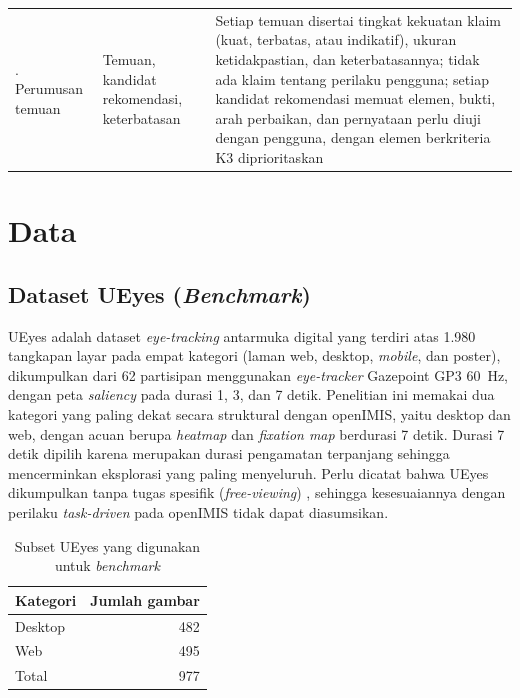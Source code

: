 \begin{longtable}{>{\raggedright\arraybackslash}p{}>{\raggedright\arraybackslash}p{}>{\raggedright\arraybackslash}p{}}
\hline
8. Perumusan temuan & Temuan, kandidat rekomendasi, keterbatasan & Setiap temuan disertai tingkat kekuatan klaim (kuat, terbatas, atau indikatif), ukuran ketidakpastian, dan keterbatasannya; tidak ada klaim tentang perilaku pengguna; setiap kandidat rekomendasi memuat elemen, bukti, arah perbaikan, dan pernyataan perlu diuji dengan pengguna, dengan elemen berkriteria K3 diprioritaskan \\
\end{longtable}

\section{Data}
\label{sec:data}

\subsection{Dataset UEyes (\emph{Benchmark})}
\label{subsec:ueyes}

UEyes \citep{jiang2023ueyes} adalah dataset \emph{eye-tracking} antarmuka digital yang terdiri atas 1.980 tangkapan layar pada empat kategori (laman web, desktop, \emph{mobile}, dan poster), dikumpulkan dari 62 partisipan menggunakan \emph{eye-tracker} Gazepoint GP3 60~Hz, dengan peta \emph{saliency} pada durasi 1, 3, dan 7 detik. Penelitian ini memakai dua kategori yang paling dekat secara struktural dengan openIMIS, yaitu desktop dan web, dengan acuan berupa \emph{heatmap} dan \emph{fixation map} berdurasi 7 detik. Durasi 7 detik dipilih karena merupakan durasi pengamatan terpanjang sehingga mencerminkan eksplorasi yang paling menyeluruh. Perlu dicatat bahwa UEyes dikumpulkan tanpa tugas spesifik (\emph{free-viewing}) \citep{jiang2023ueyes}, sehingga kesesuaiannya dengan perilaku \emph{task-driven} pada openIMIS tidak dapat diasumsikan.

\begin{table}[H]
  \centering
  \caption{Subset UEyes yang digunakan untuk \emph{benchmark}}
  \label{tab:ueyes}
  \begin{tabular}{lr}
    \hline
    \textbf{Kategori} & \textbf{Jumlah gambar} \\
    \hline
    Desktop & 482 \\
    Web & 495 \\
    \hline
    Total & 977 \\
    \hline
  \end{tabular}
\end{table}

